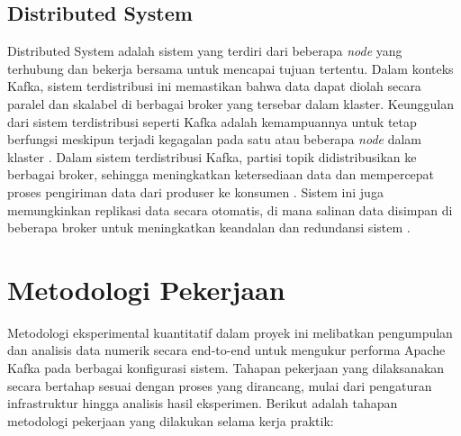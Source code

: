 \subsection{Distributed System}

Distributed System adalah sistem yang terdiri dari beberapa \textit{node} yang terhubung dan bekerja bersama untuk mencapai tujuan tertentu. Dalam konteks Kafka, sistem terdistribusi ini memastikan bahwa data dapat diolah secara paralel dan skalabel di berbagai broker yang tersebar dalam klaster. Keunggulan dari sistem terdistribusi seperti Kafka adalah kemampuannya untuk tetap berfungsi meskipun terjadi kegagalan pada satu atau beberapa \textit{node} dalam klaster \citep{ieee:distributed}. Dalam sistem terdistribusi Kafka, partisi topik didistribusikan ke berbagai broker, sehingga meningkatkan ketersediaan data dan mempercepat proses pengiriman data dari produser ke konsumen \citep{ieee:distributed}. Sistem ini juga memungkinkan replikasi data secara otomatis, di mana salinan data disimpan di beberapa broker untuk meningkatkan keandalan dan redundansi sistem \citep{ieee:distributed}.

\section{Metodologi Pekerjaan}

Metodologi eksperimental kuantitatif dalam proyek ini melibatkan pengumpulan dan analisis data numerik secara end-to-end untuk mengukur performa Apache Kafka pada berbagai konfigurasi sistem. Tahapan pekerjaan yang dilaksanakan secara bertahap sesuai dengan proses yang dirancang, mulai dari pengaturan infrastruktur hingga analisis hasil eksperimen. Berikut adalah tahapan metodologi pekerjaan yang dilakukan selama kerja praktik:

